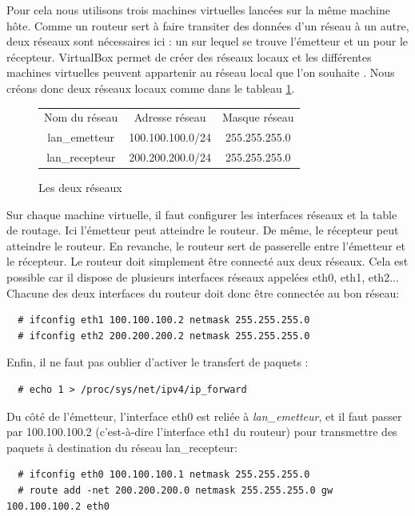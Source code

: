 \documentclass[a4paper]{article}
\begin{document}
Pour cela nous utilisons trois machines virtuelles lancées sur la même machine hôte. 
Comme un routeur sert à faire transiter des données d'un réseau à un autre, deux
réseaux sont nécessaires ici : un sur lequel se trouve l'émetteur et un pour le récepteur.
VirtualBox permet de créer des réseaux locaux et les différentes machines virtuelles
 peuvent appartenir au réseau local que l’on souhaite \cite{virtualbx}. Nous créons donc deux réseaux locaux 
 comme dans le tableau \ref{reseaux1}.

\begin{figure}[!ht]
	\centering
	\begin{tabular}{c|c|c}
	Nom du réseau & Adresse réseau & Masque réseau\\
	lan\_emetteur & 100.100.100.0/24 & 255.255.255.0\\
	lan\_recepteur & 200.200.200.0/24 & 255.255.255.0\\
	\end{tabular}
	\caption{\label{reseaux1} Les deux réseaux}
\end{figure}

Sur chaque machine virtuelle, il faut configurer les interfaces réseaux et la table de routage. 
Ici l'émetteur peut atteindre le routeur. De même, le récepteur peut atteindre le routeur. 
En revanche, le routeur sert de passerelle entre l'émetteur et le récepteur.
Le routeur doit simplement être connecté aux deux réseaux.
Cela est possible car il dispose de plusieurs interfaces réseaux appelées eth0, eth1, eth2...
Chacune des deux interfaces du routeur doit donc être
connectée au bon réseau:
\begin{verbatim}
  # ifconfig eth1 100.100.100.2 netmask 255.255.255.0
  # ifconfig eth2 200.200.200.2 netmask 255.255.255.0
\end{verbatim}

Enfin, il ne faut pas oublier d'activer le transfert de
paquets :
\begin{verbatim}
  # echo 1 > /proc/sys/net/ipv4/ip_forward
\end{verbatim}

Du côté de l'émetteur, l'interface eth$0$ est reliée à
\textit{lan\_emetteur}, et il faut passer par 100.100.100.2
(c'est-à-dire l'interface eth$1$ du routeur) pour transmettre
des paquets à destination du réseau lan\_recepteur:
\begin{verbatim}
  # ifconfig eth0 100.100.100.1 netmask 255.255.255.0
  # route add -net 200.200.200.0 netmask 255.255.255.0 gw 100.100.100.2 eth0
\end{verbatim}
\end{document}
